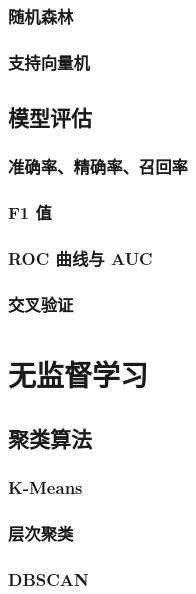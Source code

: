 \documentclass[12pt,UTF8]{ctexbook}
\begin{document}
\subsection{随机森林}

\subsection{支持向量机}

\section{模型评估}

\subsection{准确率、精确率、召回率}

\subsection{F1 值}

\subsection{ROC 曲线与 AUC}

\subsection{交叉验证}

\chapter{无监督学习}
\label{chap:unsupervised_learning}

\section{聚类算法}

\subsection{K-Means}

\subsection{层次聚类}

\subsection{DBSCAN}
\end{document}
